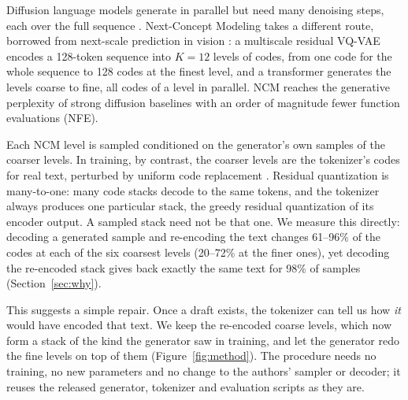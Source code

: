 \documentclass[10pt]{article}
\begin{document}
Diffusion language models generate in parallel but need many denoising steps, each over the full sequence \citep{sahoo2024mdlm,wang2025remdm}. Next-Concept Modeling \citep[NCM;][]{kumbong2026ncm} takes a different route, borrowed from next-scale prediction in vision \citep{tian2024var,kumbong2025hmar}: a multiscale residual VQ-VAE encodes a 128-token sequence into $K{=}12$ levels of codes, from one code for the whole sequence to 128 codes at the finest level, and a transformer generates the levels coarse to fine, all codes of a level in parallel. NCM reaches the generative perplexity of strong diffusion baselines with an order of magnitude fewer function evaluations (NFE).

Each NCM level is sampled conditioned on the generator's own samples of the coarser levels. In training, by contrast, the coarser levels are the tokenizer's codes for real text, perturbed by uniform code replacement \citep[``conditioning corruption'';][\S3.4]{kumbong2026ncm}. Residual quantization is many-to-one: many code stacks decode to the same tokens, and the tokenizer always produces one particular stack, the greedy residual quantization of its encoder output. A sampled stack need not be that one. We measure this directly: decoding a generated sample and re-encoding the text changes 61--96\% of the codes at each of the six coarsest levels (20--72\% at the finer ones), yet decoding the re-encoded stack gives back exactly the same text for 98\% of samples (Section~\ref{sec:why}).

This suggests a simple repair. Once a draft exists, the tokenizer can tell us how \emph{it} would have encoded that text. We keep the re-encoded coarse levels, which now form a stack of the kind the generator saw in training, and let the generator redo the fine levels on top of them (Figure~\ref{fig:method}). The procedure needs no training, no new parameters and no change to the authors' sampler or decoder; it reuses the released generator, tokenizer and evaluation scripts as they are.
\end{document}

